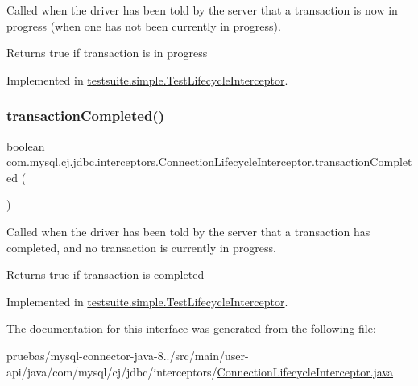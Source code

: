 Called when the driver has been told by the server that a transaction is now in progress (when one has not been currently in progress).

\begin{DoxyReturn}{Returns}
true if transaction is in progress 
\end{DoxyReturn}


Implemented in \mbox{\hyperlink{classtestsuite_1_1simple_1_1_test_lifecycle_interceptor_a5ca18da030f4569891254990898f9c1b}{testsuite.\+simple.\+Test\+Lifecycle\+Interceptor}}.

\mbox{\label{interfacecom_1_1mysql_1_1cj_1_1jdbc_1_1interceptors_1_1_connection_lifecycle_interceptor_a53811dd190160d999a9e217cf9208a84}} 
\subsubsection{\texorpdfstring{transaction\+Completed()}{transactionCompleted()}}
{\footnotesize\ttfamily boolean com.\+mysql.\+cj.\+jdbc.\+interceptors.\+Connection\+Lifecycle\+Interceptor.\+transaction\+Completed (\begin{DoxyParamCaption}{ }\end{DoxyParamCaption})}

Called when the driver has been told by the server that a transaction has completed, and no transaction is currently in progress.

\begin{DoxyReturn}{Returns}
true if transaction is completed 
\end{DoxyReturn}


Implemented in \mbox{\hyperlink{classtestsuite_1_1simple_1_1_test_lifecycle_interceptor_a00973c1a52ebc81176be2b9a46f5aa66}{testsuite.\+simple.\+Test\+Lifecycle\+Interceptor}}.



The documentation for this interface was generated from the following file\+:\begin{DoxyCompactItemize}
\item 
pruebas/mysql-\/connector-\/java-\/8../src/main/user-\/api/java/com/mysql/cj/jdbc/interceptors/\mbox{\hyperlink{_connection_lifecycle_interceptor_8java}{Connection\+Lifecycle\+Interceptor.\+java}}\end{DoxyCompactItemize}
